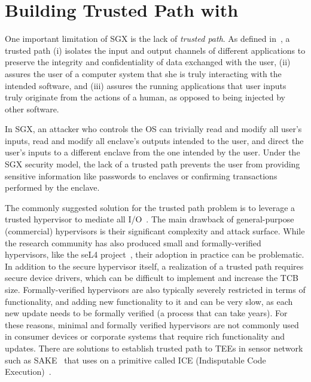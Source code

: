 \section{Building Trusted Path with \name}
\label{sec:secureInput}


One important limitation of SGX is the lack of \emph{trusted path}. As defined in~\cite{filyanov2011uni}, a trusted path (i) isolates the input and output channels of different applications to preserve the integrity and confidentiality of data exchanged with the user, (ii) assures the user of a computer system that she is truly interacting with the intended software, and (iii) assures the running applications that user inputs truly originate from the actions of a human, as opposed to being injected by other software.

In SGX, an attacker who controls the OS can trivially read and modify all user's inputs, read and modify all enclave's outputs intended to the user, and direct the user's inputs to a different enclave from the one intended by the user. Under the SGX security model, the lack of a trusted path prevents the user from providing sensitive information like passwords to enclaves or confirming transactions performed by the enclave.



The commonly suggested solution for the trusted path problem is to leverage a trusted hypervisor to mediate all I/O~\cite{weiser2017sgxio}. The main drawback of general-purpose (commercial) hypervisors is their significant complexity and attack surface. While the research community has also produced small and formally-verified hypervisors, like the seL4 project~\cite{klein2009sel4}, their adoption in practice can be problematic. In addition to the secure hypervisor itself, a realization of a trusted path requires secure device drivers, which can be difficult to implement and increase the TCB size. Formally-verified hypervisors are also typically severely restricted in terms of functionality, and adding new functionality to it and can be very slow, as each new update needs to be formally verified (a process that can take years). For these reasons, minimal and formally verified hypervisors are not commonly used in consumer devices or corporate systems that require rich functionality and updates. There are solutions to establish trusted path to TEEs in sensor network such as SAKE~\cite{seshadri2008sake} that uses on a primitive called ICE (Indisputable Code Execution)~\cite{seshadri2006scuba}.

